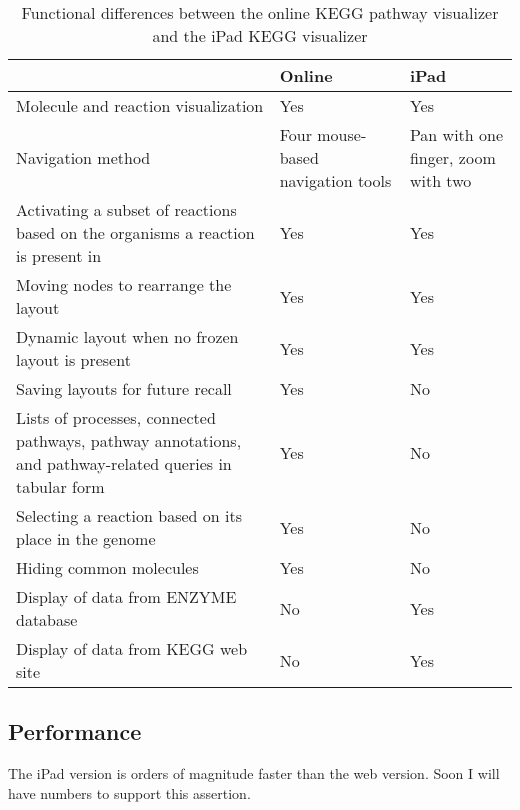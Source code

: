 \begin{table}[ht!]
\centering
\begin{tabular}{ | p{2.75in} | p{1.25in} | p{1.25in} | }
    \hline
                        & Online    & iPad \\ \hline

    Molecule and reaction visualization
                        & Yes       & Yes \\ \hline

    Navigation method   & Four mouse-based navigation tools
                                    & Pan with one finger, zoom with two
                                    \\ \hline

    Activating a subset of reactions based on the organisms a reaction is
    present in
                        & Yes       & Yes \\ \hline

    Moving nodes to rearrange the layout
                        & Yes       & Yes \\ \hline

    Dynamic layout when no frozen layout is present
                        & Yes       & Yes \\ \hline

    Saving layouts for future recall
                        & Yes       & No \\ \hline

    Lists of processes, connected pathways, pathway annotations, and
    pathway-related queries in tabular form
                        & Yes       & No \\ \hline

    Selecting a reaction based on its place in the genome
                        & Yes       & No \\ \hline

    Hiding common molecules
                        & Yes       & No \\ \hline

    Display of data from ENZYME database
                        & No        & Yes \\ \hline

    Display of data from KEGG web site
                        & No        & Yes \\ \hline
\end{tabular}
    \label{fig:kegg_comparison_table}
    \caption{Functional differences between the online KEGG pathway visualizer
    and the iPad KEGG visualizer}
\end{table}

\subsection{Performance}
\label{sect:kegg_comparison_performance}

The iPad version is orders of magnitude faster than the web version. Soon I will
have numbers to support this assertion.
